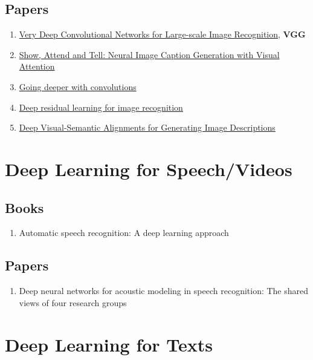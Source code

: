 \documentclass{article}
\begin{document}
\subsection{Papers}
\begin{enumerate}
	\item \href{https://arxiv.org/pdf/1409.1556.pdf}{Very Deep Convolutional Networks for Large-scale Image Recognition}, \textbf{VGG}\autocite{simonyan2014very}
	\item \href{http://jmlr.org/proceedings/papers/v37/xuc15.pdf}{Show, Attend and Tell: Neural Image Caption Generation with Visual Attention}\autocite{xu2015show}
	\item \href{https://www.cs.unc.edu/~wliu/papers/GoogLeNet.pdf}{Going deeper with convolutions}\autocite{szegedy2015going}
	\item \href{https://arxiv.org/pdf/1512.03385v1.pdf}{Deep residual learning for image recognition}\autocite{he2015deep}
	\item \href{http://cs.stanford.edu/people/karpathy/deepimagesent/}{Deep Visual-Semantic Alignments for Generating Image Descriptions}\autocite{karpathy2015deep}
\end{enumerate}

\section{Deep Learning for Speech/Videos}
\subsection{Books}
\begin{enumerate}
	\item Automatic speech recognition: A deep learning approach\autocite{yu2014automatic}
\end{enumerate}
\subsection{Papers}
\begin{enumerate}
	\item Deep neural networks for acoustic modeling in speech recognition: The shared views of four research groups\autocite{hinton2012deep}
\end{enumerate}



\section{Deep Learning for Texts}
\end{document}
